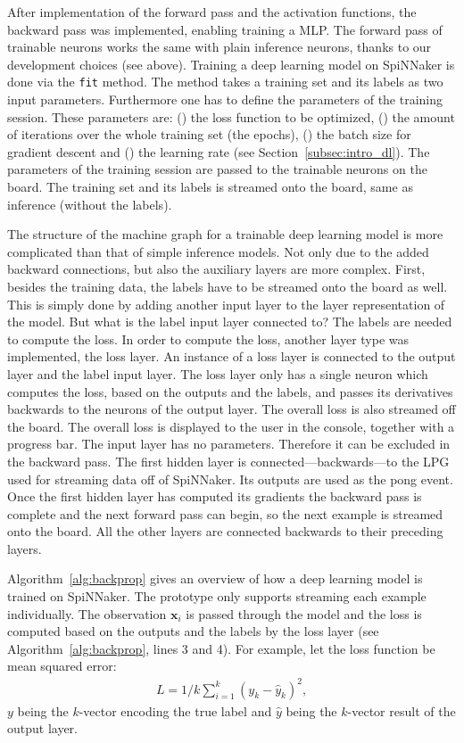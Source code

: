 \documentclass[]{article}
\begin{document}
After implementation of the forward pass and the activation functions,
the backward pass was implemented, enabling training a MLP.
The forward pass of trainable neurons works the same with plain
inference neurons, thanks to our development choices (see above).
Training a deep learning model on SpiNNaker is done via the
\texttt{fit} method.
The method takes a training set and its labels as two input
parameters.
Furthermore one has to define the parameters of the training session.
These parameters are: () the loss function to be
optimized, () the amount of iterations over the whole
training set (the epochs), () the batch size for
gradient descent and () the learning rate
(see Section~\ref{subsec:intro_dl}).
The parameters of the training session are passed to the trainable
neurons on the board.
The training set and its labels is streamed onto the board, same as
inference (without the labels).

The structure of the machine graph for a trainable deep learning
model is more complicated than that of simple inference models.
Not only due to the added backward connections, but also the
auxiliary layers are more complex.
First, besides the training data, the labels have to be streamed onto
the board as well.
This is simply done by adding another input layer to the layer
representation of the model.
But what is the label input layer connected to?
The labels are needed to compute the loss.
In order to compute the loss, another layer type was implemented,
the loss layer.
An instance of a loss layer is connected to the output layer and the
label input layer.
The loss layer only has a single neuron which computes the loss,
based on the outputs and the labels, and passes its derivatives
backwards to the neurons of the output layer.
The overall loss is also streamed off the board.
The overall loss is displayed to the user in the console, together
with a progress bar.
The input layer has no parameters.
Therefore it can be excluded in the backward pass.
The first hidden layer is connected---backwards---to the LPG used
for streaming data off of SpiNNaker.
Its outputs are used as the pong event.
Once the first hidden layer has computed its gradients the backward
pass is complete and the next forward pass can begin, so the next
example is streamed onto the board.
All the other layers are connected backwards to their preceding
layers.

Algorithm~\ref{alg:backprop} gives an overview of how a deep
learning model is trained on SpiNNaker.
The prototype only supports streaming each example individually.
The observation $\mathbf{x}_i$ is passed through the model and the
loss is computed based on the outputs and the labels by the loss layer
(see Algorithm~\ref{alg:backprop}, lines 3 and 4).
For example, let the loss function be mean squared error:
\begin{align}
L = 1/k \sum_{i=1}^k(y_k - \hat{y}_k)^2,
\end{align}
$y$ being the $k$-vector encoding the true label and $\hat{y}$ being
the $k$-vector result of the output layer.
\end{document}
